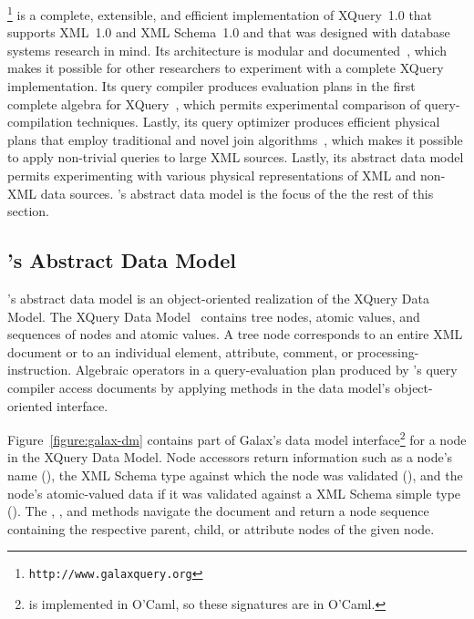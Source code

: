 \Galax{}\footnote{\texttt{http://www.galaxquery.org}} is a complete,
extensible, and efficient implementation of XQuery~1.0 that supports
XML~1.0 and XML Schema~1.0 and that was designed with database systems
research in mind.  Its architecture is modular and
documented~\cite{galax:edbt2004}, which makes it possible for other
researchers to experiment with a complete XQuery implementation.  Its
query compiler produces evaluation plans in the first complete algebra
for XQuery~\cite{galax:icde2006}, which permits experimental
comparison of query-compilation techniques.  Lastly, its query
optimizer produces efficient physical plans that employ traditional
and novel join algorithms~\cite{galax:icde2006}, which makes it
possible to apply non-trivial queries to large XML sources.  Lastly,
its abstract data model permits experimenting with various physical
representations of XML and non-XML data sources.  \Galax{}'s abstract
data model is the focus of the the rest of this section.

\subsection{\Galax{}'s Abstract Data Model}

\Galax{}'s abstract data model is an object-oriented realization of
the XQuery Data Model.  The XQuery Data Model~\cite{XPath:DataModel}
contains tree nodes, atomic values, and sequences of nodes and atomic
values.  A tree node corresponds to an entire XML document or to an
individual element, attribute, comment, or processing-instruction.
Algebraic operators in a query-evaluation plan produced by \Galax{}'s
query compiler access documents by applying methods in the data
model's object-oriented interface.

Figure~\ref{figure:galax-dm} contains part of Galax's data model
interface\footnote{\Galax{} is implemented in O'Caml, so these signatures
are in O'Caml.} for a node in the XQuery Data Model.  Node
accessors return information such as a node's name (),
the XML Schema type against which the node was validated (),
and the node's atomic-valued data if it was validated against a XML
Schema simple type ().  The , ,
and  methods navigate the document and return a node
sequence containing the respective parent, child, or attribute nodes
of the given node.

